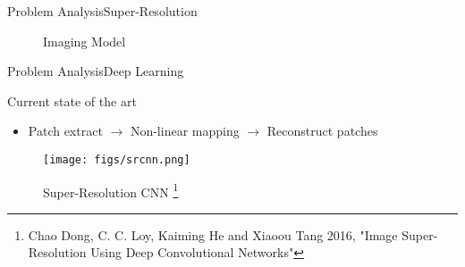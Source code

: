 \begin{frame}{Problem Analysis}{Super-Resolution}
\begin{block}{}
        \begin{figure}[!htb]
        \caption*{Imaging Model}
\end{figure}
\end{block}
\end{frame}

\begin{frame}{Problem Analysis}{Deep Learning}
    \begin{block}{}
        Current state of the art
        \begin{itemize}
            \item Patch extract $\rightarrow$ Non-linear mapping $\rightarrow$ Reconstruct patches
        \end{itemize}
        \begin{figure}
            \texttt{[image: figs/srcnn.png]}
            \caption*{Super-Resolution CNN \footnote{Chao Dong, C. C. Loy, Kaiming He and Xiaoou Tang 2016, "Image Super-Resolution Using Deep Convolutional Networks"}}
        \end{figure}
    \end{block}
\end{frame}

